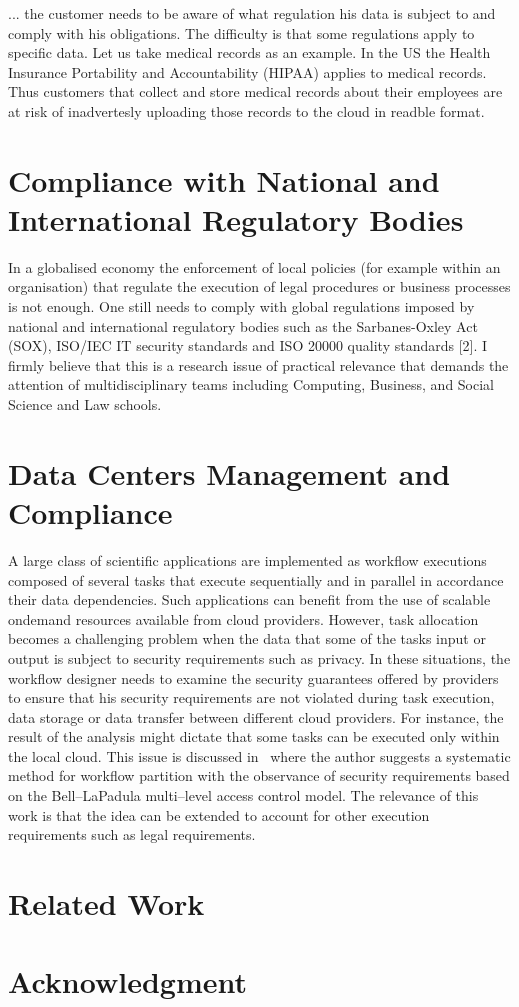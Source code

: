 \documentclass[runningheads,a4paper]{llncs}
\begin{document}
... the customer needs to be aware of what regulation his data is subject
to and comply with his obligations. The difficulty is that some regulations
apply to specific data. Let us take medical records as an example.
In the US the Health Insurance Portability and Accountability (HIPAA) applies to medical records. Thus
customers that collect and store medical records about their employees
are at risk of inadvertesly uploading those records to the cloud in 
readble format.
 



\section{Compliance with National and International Regulatory Bodies}
In a globalised economy the enforcement of local policies (for example within an organisation) that regulate the execution of legal procedures or business processes is not enough. One still needs to comply with global regulations imposed by national and international regulatory bodies such as the Sarbanes-Oxley Act (SOX), ISO/IEC IT security standards and ISO 20000 quality standards [2]. I firmly believe that this is a research issue of practical relevance that demands the attention of multidisciplinary teams including Computing, Business, and Social Science and Law schools. 

\section{Data Centers Management and Compliance}


A large class of scientific applications are implemented as
workflow executions composed of several tasks that execute
sequentially and in parallel in accordance their data
dependencies. Such applications can benefit from the use of 
scalable ondemand resources available from cloud providers. 
However, task allocation becomes a challenging problem when
the data that some of the tasks input or output is subject
to security requirements such as privacy.  In these situations, 
the workflow designer needs to examine the security guarantees offered
by providers to ensure that his security requirements are
not violated during task execution, data storage or data transfer between
different cloud providers. For instance,  the result of the
analysis might dictate that some tasks can be executed only
within the local cloud. This issue is discussed in~\cite{Watson2011}
where the author suggests a systematic method for workflow
partition with the observance of security requirements based 
on the Bell--LaPadula multi--level access control 
model. The relevance of this work is that the idea can be extended
to account for other execution requirements such as legal
requirements.

\section{Related Work}

\cite{Vaquero2011}

\cite{Millard2013}

\cite{Mitrakas2013}

\section*{Acknowledgment}




\end{document}
